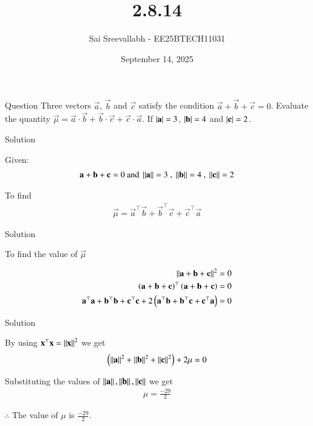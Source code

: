 \documentclass{beamer}
\title 
{2.8.14}
\date{September 14, 2025}
\author 
{Sai Sreevallabh - EE25BTECH11031}
\begin{document}
\frame{\titlepage}
\begin{frame}{Question}
Three vectors $\vec{a}$, $\vec{b}$ and $\vec{c}$ satisfy the condition $\vec{a}+\vec{b}+\vec{c}=0$. Evaluate the quantity $\vec{\mu} = \vec{a}\cdot\vec{b} + \vec{b}\cdot\vec{c} + \vec{c}\cdot\vec{a}$. If $\left\vert\mathbf{a}\right\vert = 3$, $\left\vert\mathbf{b}\right\vert=4$ and $\left\vert\mathbf{c}\right\vert=2$. \\
\end{frame}



\begin{frame}{Solution}

Given: 
\begin{align}
    \vec{a}+\vec{b}+\vec{c}=0 \ \text{and}\ \norm{\vec{a}}=3 \ , \ \norm{\vec{b}}=4 \ , \ \norm{\vec{c}}=2
\end{align}

To find
\begin{align}
    \vec{\mu} = \vec{a}^\top\vec{b}+\vec{b}^\top\vec{c}+\vec{c}^\top\vec{a}
\end{align}

\end{frame}

\begin{frame}{Solution}

To find the value of $\vec{\mu}$

\begin{align}
    \left\lVert\mathbf{a}+\mathbf{b}+\mathbf{c}\right\rVert^2 &= 0\\
    \left(\mathbf{a}+\mathbf{b}+\mathbf{c}\right)^\top\left(\mathbf{a}+\mathbf{b}+\mathbf{c}\right)&=0\\
    \mathbf{a}^\top\mathbf{a} + \mathbf{b}^\top\mathbf{b} +\mathbf{c}^\top\mathbf{c} + 2\left(\mathbf{a}^\top\mathbf{b} + \mathbf{b}^\top\mathbf{c} + \mathbf{c}^\top\mathbf{a}\right) &= 0
\end{align}

\end{frame}

\begin{frame}{Solution}

By using $\mathbf{x}^\top\mathbf{x} = \left\lVert\mathbf{x}\right\rVert^2$ we get
\begin{align}
    \left(\left\lVert\mathbf{a}\right\rVert^2 + \left\lVert\mathbf{b}\right\rVert^2 + \left\lVert\mathbf{c}\right\rVert^2\right) + 2\mu = 0
\end{align}

Substituting the values of $\left\lVert\mathbf{a}\right\rVert, \left\lVert\mathbf{b}\right\rVert, \left\lVert\mathbf{c}\right\rVert$ we get
\begin{align}
  \mu = \frac{-29}{2}
\end{align}

$\therefore$ The value of $\mu$ is $\frac{-29}{2}$.

\end{frame}
\end{document}
